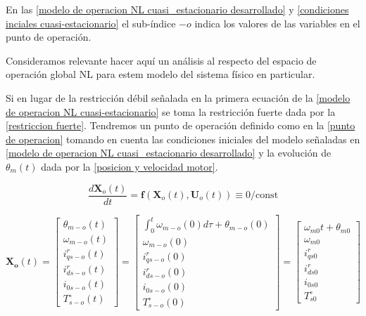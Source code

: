 \documentclass[a4paper, 10pt, onecolumn,journal]{ieeeconf}
\begin{document}
En las \cref{modelo de operacion NL cuasi_estacionario desarrollado} y \cref{condiciones inciales cuasi-estacionario}
el sub-índice $-o$ indica los valores de las variables en el punto de operación.

Consideramos relevante hacer aquí un análisis al respecto
del espacio de operación global NL para estem modelo del sistema físico
en particular.

Si en lugar de la restricción débil señalada en la primera ecuación de la \cref{modelo de operacion NL cuasi-estacionario}
se toma la restricción fuerte dada por la \cref{restriccion fuerte}. Tendremos un
punto de operación definido como en la \cref{punto de operacion} tomando en cuenta
las condiciones iniciales del modelo señaladas en \cref{modelo de operacion NL cuasi_estacionario desarrollado} y 
la evolución de $\theta_m(t)$ dada por la \cref{posicion y velocidad motor}.


\begin{equation}
    \frac{d\mathbf{X}_o(t)}{dt} =  \mathbf{f}(\mathbf{X}_o(t), \mathbf{U}_o(t)) \equiv 0/\text{const}
    \label{restriccion fuerte}
\end{equation}

\begin{equation}
    \mathbf{X_o}(t)
    =
    \begin{bmatrix} 
        \theta_{m-o}(t) \\ 
        \omega_{m-o}(t) \\ 
        i^r_{qs-o}(t) \\ 
        i^r_{ds-o}(t)\\ 
        i_{0s-o}(t)\\ 
        T^\circ_{s-o}(t)
    \end{bmatrix}
    =
    \begin{bmatrix} 
        \int_{0}^{t} \omega_{m-o}(0) d\tau + \theta_{m-o}(0)\\
        \omega_{m-o}(0)\\
        i^r_{qs-o}(0) \\
        i^r_{ds-o}(0)\\
        i_{0s-o}(0)\\
        T^\circ_{s-o}(0)
    \end{bmatrix}
    =
    \begin{bmatrix} 
        \omega_{m0}t + \theta_{m0}\\
        \omega_{m0} \\ 
        i^r_{qs0} \\ 
        i^r_{ds0} \\ 
        i_{0s0} \\ 
        T^\circ_{s0} 
    \end{bmatrix}
    \label{punto de operacion}
\end{equation}
\end{document}
